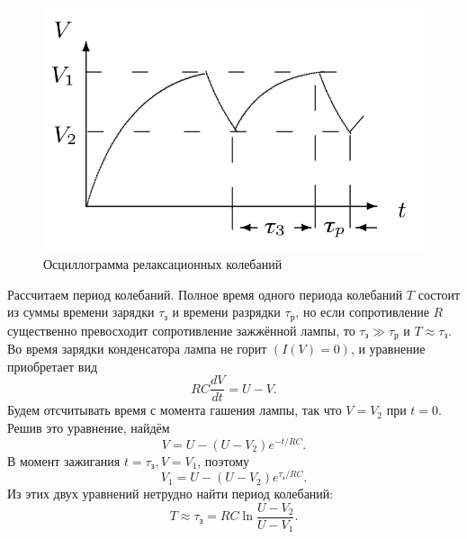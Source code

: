 \documentclass[a4paper, fontsize=14pt]{article}
\begin{document}
\begin{figure}[H]
		\includegraphics[width = 0.4\linewidth]{kol.png}
		\caption{Осциллограмма релаксационных колебаний}
	\end{figure}
Рассчитаем период колебаний. Полное время одного периода колебаний $T$ состоит из суммы времени зарядки $\tau_\text{з}$ и времени разрядки $\tau_\text{р}$, но если сопротивление $R$ существенно превосходит сопротивление зажжённой лампы, то $\tau_\text{з} \gg \tau_\text{р}$ и $T \approx \tau_\text{з}$. Во время зарядки конденсатора лампа не горит $(I(V) = 0)$, и уравнение приобретает вид
\[
	RC \frac{dV}{dt} = U - V.
\]
Будем отсчитывать время с момента гашения лампы, так что $V = V_2$ при $t = 0$. Решив это уравнение, найдём
\[
	V = U - (U - V_2) e^{-t / RC}.
\]
В момент зажигания $t = \tau_\text{з}, V = V_1$, поэтому
\[
	V_1 = U - (U - V_2) e^{\tau_\text{з} / RC}.
\]
Из этих двух уравнений нетрудно найти период колебаний:
\[
	T \approx \tau_\text{з} = RC \ln \frac{U - V_2}{U - V_1}.
\]
\end{document}
